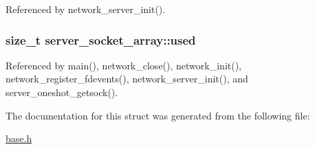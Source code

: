 Referenced by network\-\_\-server\-\_\-init().

\hypertarget{structserver__socket__array_a61406275cac3bc6d50290af40afbb5be}{
\subsubsection[{used}]{\setlength{\rightskip}{0pt plus 5cm}size\-\_\-t server\-\_\-socket\-\_\-array\-::used}}\label{structserver__socket__array_a61406275cac3bc6d50290af40afbb5be}


Referenced by main(), network\-\_\-close(), network\-\_\-init(), network\-\_\-register\-\_\-fdevents(), network\-\_\-server\-\_\-init(), and server\-\_\-oneshot\-\_\-getsock().



The documentation for this struct was generated from the following file\-:\begin{DoxyCompactItemize}
\item 
\hyperlink{base_8h}{base.\-h}\end{DoxyCompactItemize}
